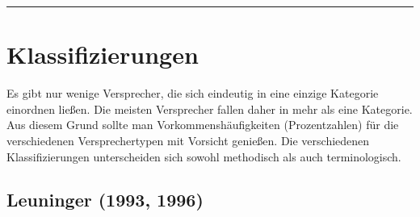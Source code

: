 \documentclass[
  letterpaper,
]{scrbook}
\begin{document}
\begin{center}\rule{0.5\linewidth}{0.5pt}\end{center}

\hypertarget{klassifizierungen}{%
\section{Klassifizierungen}\label{klassifizierungen}}

Es gibt nur wenige Versprecher, die sich eindeutig in eine einzige
Kategorie einordnen ließen. Die meisten Versprecher fallen daher in mehr
als eine Kategorie. Aus diesem Grund sollte man Vorkommenshäufigkeiten
(Prozentzahlen) für die verschiedenen Versprechertypen mit Vorsicht
genießen. Die verschiedenen Klassifizierungen unterscheiden sich sowohl
methodisch als auch terminologisch.

\hypertarget{leuninger-1993-1996}{%
\subsection{Leuninger (1993, 1996)}\label{leuninger-1993-1996}}
\end{document}
